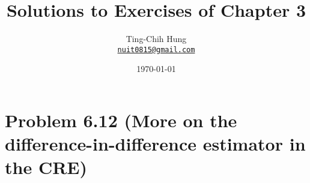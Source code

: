 \documentclass[10pt]{article}
\title{Solutions to Exercises of Chapter 3}
\author{Ting-Chih Hung \\ \href{mailto:nuit0815@gmail.com}{\texttt{nuit0815@gmail.com}}}
\date{\today}
\begin{document}
\maketitle

\section*{Problem 6.12 (More on the difference-in-difference estimator in the CRE)}

\printglossaries
\end{document}
